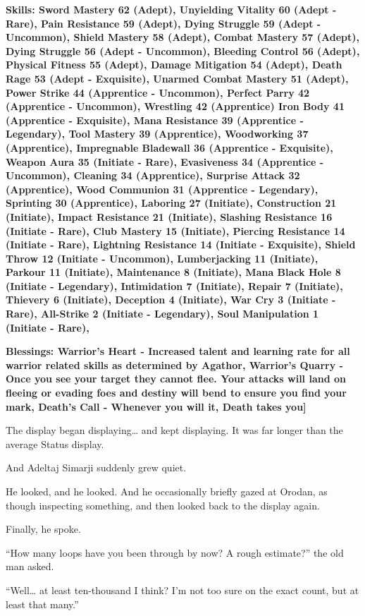 \documentclass[a4paper,10pt]{book}
\begin{document}
\textbf{Skills: Sword Mastery 62 (Adept), Unyielding Vitality 60 (Adept - Rare), Pain Resistance 59 (Adept), Dying Struggle 59 (Adept - Uncommon), Shield Mastery 58 (Adept), Combat Mastery 57 (Adept), Dying Struggle 56 (Adept - Uncommon), Bleeding Control 56 (Adept), Physical Fitness 55 (Adept), Damage Mitigation 54 (Adept), Death Rage 53 (Adept - Exquisite), Unarmed Combat Mastery 51 (Adept), Power Strike 44 (Apprentice - Uncommon), Perfect Parry 42 (Apprentice - Uncommon), Wrestling 42 (Apprentice) Iron Body 41 (Apprentice - Exquisite), Mana Resistance 39 (Apprentice - Legendary), Tool Mastery 39 (Apprentice), Woodworking 37 (Apprentice), Impregnable Bladewall 36 (Apprentice - Exquisite), Weapon Aura 35 (Initiate - Rare), Evasiveness 34 (Apprentice - Uncommon), Cleaning 34 (Apprentice), Surprise Attack 32 (Apprentice), Wood Communion 31 (Apprentice - Legendary), Sprinting 30 (Apprentice), Laboring 27 (Initiate), Construction 21 (Initiate), Impact Resistance 21 (Initiate), Slashing Resistance 16 (Initiate - Rare), Club Mastery 15 (Initiate), Piercing Resistance 14 (Initiate - Rare), Lightning Resistance 14 (Initiate - Exquisite), Shield Throw 12 (Initiate - Uncommon), Lumberjacking 11 (Initiate), Parkour 11 (Initiate), Maintenance 8 (Initiate), Mana Black Hole 8 (Initiate - Legendary), Intimidation 7 (Initiate), Repair 7 (Initiate), Thievery 6 (Initiate), Deception 4 (Initiate), War Cry 3 (Initiate - Rare), All-Strike 2 (Initiate - Legendary), Soul Manipulation 1 (Initiate - Rare),}\par
\textbf{Blessings: Warrior’s Heart - Increased talent and learning rate for all warrior related skills as determined by Agathor, Warrior’s Quarry - Once you see your target they cannot flee. Your attacks will land on fleeing or evading foes and destiny will bend to ensure you find your mark, Death’s Call - Whenever you will it, Death takes you]}\par
The display began displaying… and kept displaying. It was far longer than the average Status display.\par
And Adeltaj Simarji suddenly grew quiet.\par
He looked, and he looked. And he occasionally briefly gazed at Orodan, as though inspecting something, and then looked back to the display again.\par
Finally, he spoke.\par
“How many loops have you been through by now? A rough estimate?” the old man asked.\par
“Well… at least ten-thousand I think? I’m not too sure on the exact count, but at least that many.”\par
\end{document}
